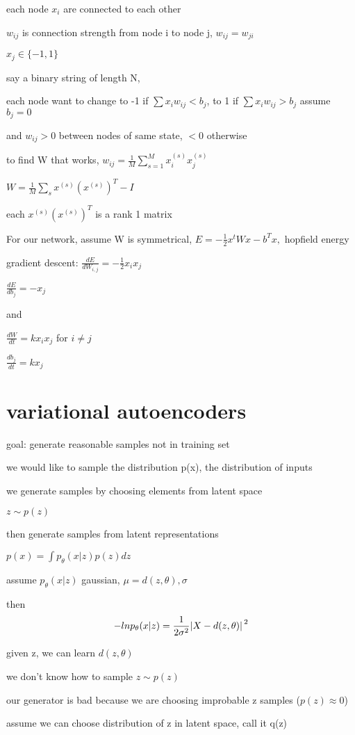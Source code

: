 \documentclass[10pt]{article}
\theoremstyle{break}
\begin{document}
each node $x_i$ are connected to each other

$w_{ij}$ is connection strength from node i to node j, $w_{ij}=w_{ji}$

$x_j \in \{-1, 1\}$

say a binary string of length N,

each node want to change to -1 if $\sum x_i w_{ij}<b_j$, to 1 if $\sum x_i w_{ij}>b_j$ assume $b_j=0$

and $w_{ij}>0$ between nodes of same state, $<0$ otherwise

to find W that works, 
$w_{ij}=\frac{1}{M}\sum_{s=1}^M x_i ^{(s)} x_j ^{(s)}$

$W = \frac{1}{M}\sum_s x^{(s)} (x^{(s)})^T - I$

each $x^{(s)} (x^{(s)})^T$ is a rank 1 matrix


For our network, assume W is symmetrical, 
$E = -\frac{1}{2}x^tWx - b^Tx, $ hopfield energy

gradient descent: 
$\frac{dE}{dW_{i,j}}=-\frac{1}{2}x_i x_j$

$\frac{dE}{db_j}=-x_j$

and 

$\frac{dW}{dt}=kx_i x_j$ for $i\neq j$

$\frac{db_j}{dt}=kx_j$

\section{variational autoencoders}
goal: generate reasonable samples not in training set

we would like to sample the distribution p(x), the distribution of inputs

we generate samples by choosing elements from latent space 

$z\sim p(z)$

then generate samples from latent representations 

$p(x)=\int p_\theta (x|z) p(z) dz$

assume $p_\theta(x|z)$ gaussian, $\mu = d(z,\theta), \sigma$

then $$-ln p_\theta(x|z) = \frac{1}{2\sigma^2}\abs*{X-d(z,\theta)}^2$$

given z, we can learn $d(z,\theta)$

we don't know how to sample $z\sim p(z)$


our generator is bad because we are choosing improbable z samples ($p(z)\approx 0$)


assume we can choose distribution of z in latent space, call it q(z)
\end{document}
